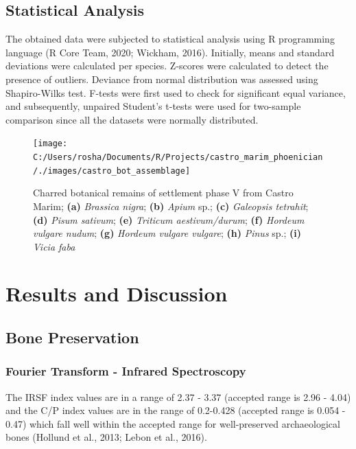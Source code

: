 \documentclass[5p]{elsarticle} %
\begin{document}
\hypertarget{statistical-analysis}{%
\subsection{Statistical Analysis}\label{statistical-analysis}}

The obtained data were subjected to statistical analysis using R programming language (R Core Team, 2020; Wickham, 2016). Initially, means and standard deviations were calculated per species. Z-scores were calculated to detect the presence of outliers. Deviance from normal distribution was assessed using Shapiro-Wilks test. F-tests were first used to check for significant equal variance, and subsequently, unpaired Student's t-tests were used for two-sample comparison since all the datasets were normally distributed.



\begin{figure}
\texttt{[image: C:/Users/rosha/Documents/R/Projects/castro\_marim\_phoenician/./images/castro\_bot\_assemblage]} \caption{Charred botanical remains of settlement phase V from Castro Marim; \textbf{(a)} \emph{Brassica nigra}; \textbf{(b)} \emph{Apium} sp.; \textbf{(c)} \emph{Galeopsis tetrahit}; \textbf{(d)} \emph{Pisum sativum}; \textbf{(e)} \emph{Triticum aestivum/durum}; \textbf{(f)} \emph{Hordeum vulgare nudum}; \textbf{(g)} \emph{Hordeum vulgare vulgare}; \textbf{(h)} \emph{Pinus} sp.; \textbf{(i)} \emph{Vicia faba}}\label{fig:castro-archbot-assemblage}
\end{figure}

\hypertarget{results-and-discussion}{%
\section{Results and Discussion}\label{results-and-discussion}}

\hypertarget{bone-preservation}{%
\subsection{Bone Preservation}\label{bone-preservation}}

\hypertarget{fourier-transform---infrared-spectroscopy}{%
\subsubsection{Fourier Transform - Infrared Spectroscopy}\label{fourier-transform---infrared-spectroscopy}}

The IRSF index values are in a range of 2.37 - 3.37 (accepted range is 2.96 - 4.04) and the C/P index values are in the range of 0.2-0.428 (accepted range is 0.054 - 0.47) which fall well within the accepted range for well-preserved archaeological bones (Hollund et al., 2013; Lebon et al., 2016).
\end{document}
